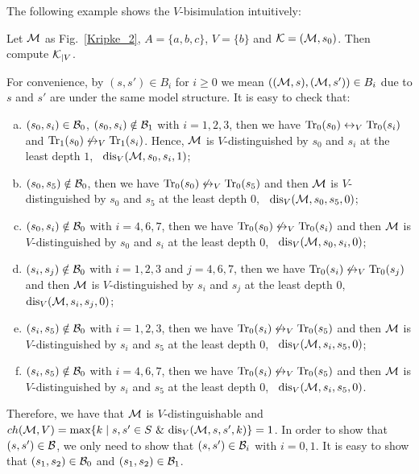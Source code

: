 \documentclass{article}
\begin{document}
The following example shows the $V$-bisimulation intuitively:

\begin{example}
Let ${\cal M}$ as Fig.~\ref{Kripke_2}, $A=\{a,b,c\}$, $V=\{b\}$ and ${\cal K}= ({\cal M}, s_0)$. Then compute ${\cal K}_{|V}$.

For convenience, by $(s, s') \in B_i$ for $i \ge 0$ we mean $(({\cal M}, s), ({\cal M},s'))\in B_i$ due to $s$ and $s'$ are under the same  model structure.
It is easy to check that:
\begin{enumerate}[(a)]
  \item $(s_0, s_i) \in {\cal B}_0$, $(s_0, s_i) \notin {\cal B}_1$ with $i=1,2,3$, then we have $\textrm{Tr}_0(s_0) \leftrightarrow_V \textrm{Tr}_0(s_i)$ and $\textrm{Tr}_1(s_0) \not\leftrightarrow_V \textrm{Tr}_1(s_i)$. Hence, ${\cal M}$ is $V$-distinguished by $s_0$ and $s_i$ at the least depth $1$, \ie\ $\textrm{dis}_V({\cal M}, s_0, s_i, 1)$;
  \item $(s_0, s_5) \notin {\cal B}_0$, then we have $\textrm{Tr}_0(s_0) \not\leftrightarrow_V \textrm{Tr}_0(s_5)$ and then ${\cal M}$ is $V$-distinguished by $s_0$ and $s_5$ at the least depth $0$, \ie\ $\textrm{dis}_V({\cal M}, s_0, s_5, 0)$;
  \item $(s_0, s_i) \notin {\cal B}_0$ with $i=4,6,7$, then we have $\textrm{Tr}_0(s_0) \not\leftrightarrow_V \textrm{Tr}_0(s_i)$ and then ${\cal M}$ is $V$-distinguished by $s_0$ and $s_i$ at the least depth $0$, \ie\ $\textrm{dis}_V({\cal M}, s_0, s_i, 0)$;
  \item $(s_i, s_j) \notin {\cal B}_0$ with $i=1,2,3$ and $j=4,6,7$, then we have $\textrm{Tr}_0(s_i) \not\leftrightarrow_V \textrm{Tr}_0(s_j)$ and then ${\cal M}$ is $V$-distinguished by $s_i$ and $s_j$ at the least depth $0$, \ie\ $\textrm{dis}_V({\cal M}, s_i, s_j, 0)$;
  \item $(s_i, s_5) \notin {\cal B}_0$ with $i=1,2,3$, then we have $\textrm{Tr}_0(s_i) \not\leftrightarrow_V \textrm{Tr}_0(s_5)$ and then ${\cal M}$ is $V$-distinguished by $s_i$ and $s_5$ at the least depth $0$, \ie\ $\textrm{dis}_V({\cal M}, s_i, s_5, 0)$;
  \item $(s_i, s_5) \notin {\cal B}_0$ with $i=4,6,7$, then we have $\textrm{Tr}_0(s_i) \not\leftrightarrow_V \textrm{Tr}_0(s_5)$ and then ${\cal M}$ is $V$-distinguished by $s_i$ and $s_5$ at the least depth $0$, \ie\ $\textrm{dis}_V({\cal M}, s_i, s_5, 0)$.
\end{enumerate}

Therefore, we have that ${\cal M}$ is $V$-distinguishable and $ch(\Hm, V)=\max\{k\mid s,s'\in S\ \&\ \dis_V({\cal M},s,s',k)\}=1$.
In order to show that $(s, s')\in {\cal B}$, we only need to show that $(s,s')\in {\cal B}_i$ with $i=0,1$.
It is easy to show that $(s_1,s_2) \in {\cal B}_0$ and $(s_1,s_2) \in {\cal B}_1$.



\end{example}
\end{document}
